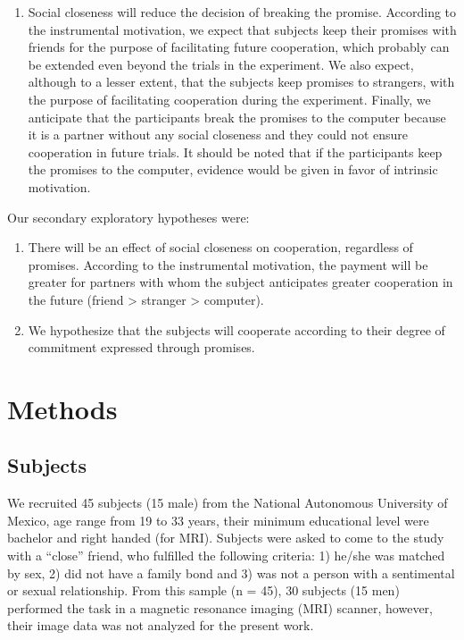 \documentclass[smallextended]{svjour3}       %
\providecommand{\tightlist}{%
  \setlength{\itemsep}{0pt}\setlength{\parskip}{0pt}}
\begin{document}
\begin{enumerate}
\def\labelenumi{\arabic{enumi}.}
\tightlist
\item
  Social closeness will reduce the decision of breaking the promise.
  According to the instrumental motivation, we expect that subjects keep
  their promises with friends for the purpose of facilitating future
  cooperation, which probably can be extended even beyond the trials in
  the experiment. We also expect, although to a lesser extent, that the
  subjects keep promises to strangers, with the purpose of facilitating
  cooperation during the experiment. Finally, we anticipate that the
  participants break the promises to the computer because it is a
  partner without any social closeness and they could not ensure
  cooperation in future trials. It should be noted that if the
  participants keep the promises to the computer, evidence would be
  given in favor of intrinsic motivation.
\end{enumerate}

Our secondary exploratory hypotheses were:

\begin{enumerate}
\def\labelenumi{\arabic{enumi}.}
\setcounter{enumi}{1}
\item
  There will be an effect of social closeness on cooperation, regardless
  of promises. According to the instrumental motivation, the payment
  will be greater for partners with whom the subject anticipates greater
  cooperation in the future (friend \textgreater{} stranger
  \textgreater{} computer).
\item
  We hypothesize that the subjects will cooperate according to their
  degree of commitment expressed through promises.
\end{enumerate}

\hypertarget{methods}{%
\section{Methods}\label{methods}}

\hypertarget{subjects}{%
\subsection{Subjects}\label{subjects}}

We recruited 45 subjects (15 male) from the National Autonomous
University of Mexico, age range from 19 to 33 years, their minimum
educational level were bachelor and right handed (for MRI). Subjects
were asked to come to the study with a ``close'' friend, who fulfilled
the following criteria: 1) he/she was matched by sex, 2) did not have a
family bond and 3) was not a person with a sentimental or sexual
relationship. From this sample (n = 45), 30 subjects (15 men) performed
the task in a magnetic resonance imaging (MRI) scanner, however, their
image data was not analyzed for the present work.
\end{document}
